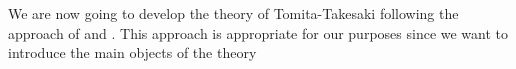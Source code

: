 We are now going to develop the theory of Tomita-Takesaki following the approach of \cite{Duvenhage1999} and \cite{Rieffel1977}. This approach is appropriate for our purposes since we want to introduce the main objects of the theory 